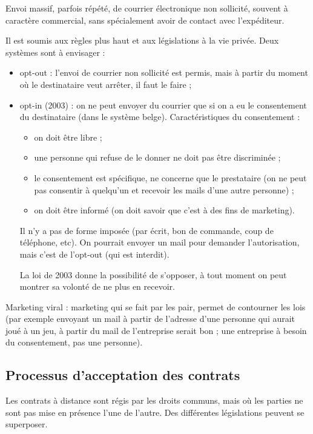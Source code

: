 		Envoi massif, parfois répété, de courrier électronique non sollicité, souvent à caractère commercial, sans spécialement avoir de contact avec l'expéditeur.
		
		Il est soumis aux règles plus haut et aux législations à la vie privée. Deux systèmes sont à envisager :
		
		\begin{itemize}
			\item opt-out : l'envoi de courrier non sollicité est permis, mais à partir du moment où le destinataire veut  arrêter, il faut le faire ;
			\item opt-in (2003) : on ne peut envoyer du courrier que si on a eu le consentement du destinataire (dans le système belge).  Caractéristiques du consentement :
			
			
			\begin{itemize}
				\item on doit être libre ;
				\item une personne qui refuse de le donner ne doit pas être discriminée ;
				\item le consentement est spécifique, ne concerne que le prestataire (on ne peut pas consentir à quelqu'un et recevoir les mails d'une autre personne) ;
				\item on doit être informé (on doit savoir que c'est à des fins de marketing).
			\end{itemize}
			
			Il n'y a pas de forme imposée (par écrit, bon de commande, coup de téléphone, etc). On pourrait envoyer un mail pour demander l'autorisation, mais c'est de l'opt-out (qui est interdit).
			
			La loi de 2003 donne la possibilité de s'opposer, à tout moment on peut montrer sa volonté de ne plus en recevoir.
		\end{itemize}
		
		Marketing viral : marketing qui se fait par les pair, permet de contourner les lois (par exemple envoyant un mail à partir de l'adresse d'une personne qui aurait joué à un jeu, à partir du mail de l'entreprise serait bon ; une entreprise à besoin du consentement, pas une personne).
	
		\subsection{Processus d'acceptation des contrats}
	
		Les contrats à distance sont régis par les droits communs, mais où les parties ne sont pas mise en présence l'une de l'autre. Des différentes législations peuvent se superposer.
		
